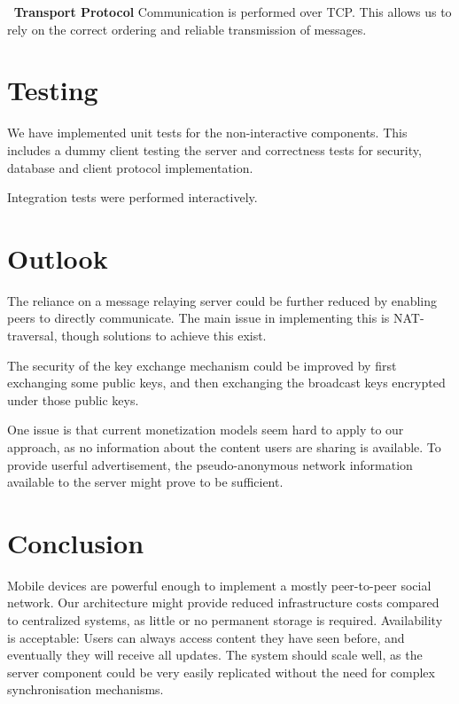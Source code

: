 \documentclass{report}
\begin{document}
\vspace{-2mm}
$\:$\newline
\textbf{Transport Protocol}\newline
\indent Communication is performed over TCP. This allows us to rely on the correct ordering and reliable transmission of messages.

\section{Testing}

We have implemented unit tests for the non-interactive components. This includes a dummy client testing the server and correctness tests for security, database and client protocol implementation.

Integration tests were performed interactively.

\section{Outlook}

The reliance on a message relaying server could be further reduced by enabling peers to directly communicate. The main issue in implementing this is NAT-traversal, though solutions to achieve this exist.

The security of the key exchange mechanism could be improved by first exchanging some public keys, and then exchanging the broadcast keys encrypted under those public keys.

One issue is that current monetization models seem hard to apply to our approach, as no information about the content users are sharing is available. To provide userful advertisement, the pseudo-anonymous network information available to the server might prove to be sufficient. 

\section{Conclusion}

Mobile devices are powerful enough to implement a mostly peer-to-peer social network. Our architecture might provide reduced infrastructure costs compared to centralized systems, as little or no permanent storage is required. Availability is acceptable: Users can always access content they have seen before, and eventually they will receive all updates. 
The system should scale well, as the server component could be very easily replicated without the need for complex synchronisation mechanisms.
\end{document}
